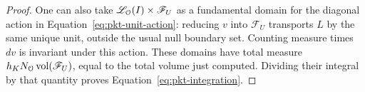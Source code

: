 \begin{proof}
One can also take \(\mathscr L_{\mathcal O}(I)\times\mathscr F_U\) as a
fundamental domain for the diagonal action in
Equation~\eqref{eq:pkt-unit-action}: reducing \(v\) into
\(\mathscr F_U\) transports \(L\) by the same unique unit, outside
the usual null boundary set.  Counting measure times \(dv\) is
invariant under this action.  These domains have total measure
\(h_KN_{\mathcal O}\operatorname{vol}(\mathscr F_U)\), equal to the total volume just
computed.  Dividing their integral by that quantity proves
Equation~\eqref{eq:pkt-integration}.
\end{proof}
